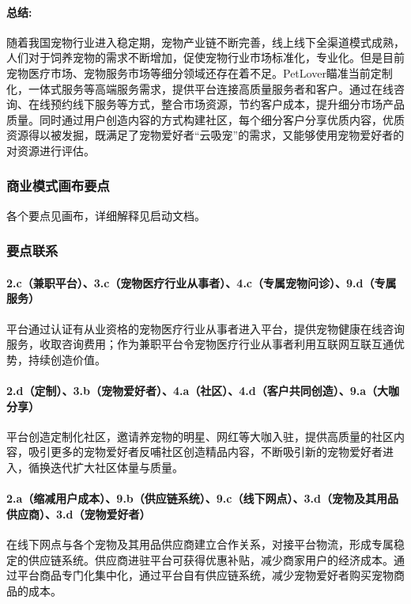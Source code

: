 \documentclass[a4paper]{ctexart}
\begin{document}
\paragraph{总结:}

随着我国宠物行业进入稳定期，宠物产业链不断完善，线上线下全渠道模式成熟，人们对于饲养宠物的需求不断增加，促使宠物行业市场标准化，专业化。但是目前宠物医疗市场、宠物服务市场等细分领域还存在着不足。PetLover瞄准当前定制化，一体式服务等高端服务需求，提供平台连接高质量服务者和客户。通过在线咨询、在线预约线下服务等方式，整合市场资源，节约客户成本，提升细分市场产品质量。同时通过用户创造内容的方式构建社区，每个细分客户分享优质内容，优质资源得以被发掘，既满足了宠物爱好者“云吸宠”的需求，又能够使用宠物爱好者的对资源进行评估。

\subsubsection{商业模式画布要点}

各个要点见画布，详细解释见启动文档。

\subsubsection{要点联系}

\paragraph{2.c（兼职平台）、3.c（宠物医疗行业从事者）、4.c（专属宠物问诊）、9.d（专属服务）}平台通过认证有从业资格的宠物医疗行业从事者进入平台，提供宠物健康在线咨询服务，收取咨询费用；作为兼职平台令宠物医疗行业从事者利用互联网互联互通优势，持续创造价值。
\paragraph{2.d（定制）、3.b（宠物爱好者）、4.a（社区）、4.d（客户共同创造）、9.a（大咖分享）}平台创造定制化社区，邀请养宠物的明星、网红等大咖入驻，提供高质量的社区内容，吸引更多的宠物爱好者反哺社区创造精品内容，不断吸引新的宠物爱好者进入，循换迭代扩大社区体量与质量。
\paragraph{2.a（缩减用户成本）、9.b（供应链系统）、9.c（线下网点）、3.d（宠物及其用品供应商）、3.d（宠物爱好者）}在线下网点与各个宠物及其用品供应商建立合作关系，对接平台物流，形成专属稳定的供应链系统。供应商进驻平台可获得优惠补贴，减少商家用户的经济成本。通过平台商品专门化集中化，通过平台自有供应链系统，减少宠物爱好者购买宠物商品的成本。
\end{document}
